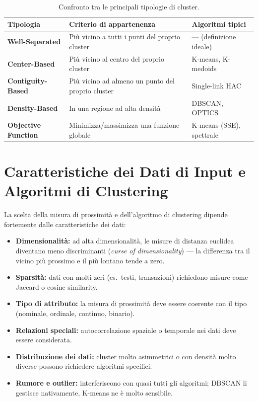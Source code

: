 \begin{table}[htbp]
\centering
\small
\begin{tabularx}{\textwidth}{>{\bfseries}p{3.2cm} >{\raggedright\arraybackslash}X >{\raggedright\arraybackslash}X}
\toprule
Tipologia & Criterio di appartenenza & Algoritmi tipici \\
\midrule
Well-Separated & Più vicino a tutti i punti del proprio cluster & --- (definizione ideale) \\
\addlinespace
Center-Based & Più vicino al centro del proprio cluster & K-means, K-medoids \\
\addlinespace
Contiguity-Based & Più vicino ad almeno un punto del proprio cluster & Single-link HAC \\
\addlinespace
Density-Based & In una regione ad alta densità & DBSCAN, OPTICS \\
\addlinespace
Objective Function & Minimizza/massimizza una funzione globale & K-means (SSE), spettrale \\
\bottomrule
\end{tabularx}
\caption{Confronto tra le principali tipologie di cluster.}
\label{tab:cluster-types}
\end{table}

\section{Caratteristiche dei Dati di Input e Algoritmi di Clustering}
\label{sec:clustering-input}

La scelta della misura di prossimità e dell'algoritmo di clustering dipende fortemente dalle caratteristiche dei dati:

\begin{itemize}
  \item \textbf{Dimensionalità:} ad alta dimensionalità, le misure di distanza euclidea diventano meno discriminanti (\textit{curse of dimensionality}) — la differenza tra il vicino più prossimo e il più lontano tende a zero.
  \item \textbf{Sparsità:} dati con molti zeri (es.\ testi, transazioni) richiedono misure come Jaccard o cosine similarity.
  \item \textbf{Tipo di attributo:} la misura di prossimità deve essere coerente con il tipo (nominale, ordinale, continuo, binario).
  \item \textbf{Relazioni speciali:} autocorrelazione spaziale o temporale nei dati deve essere considerata.
  \item \textbf{Distribuzione dei dati:} cluster molto asimmetrici o con densità molto diverse possono richiedere algoritmi specifici.
  \item \textbf{Rumore e outlier:} interferiscono con quasi tutti gli algoritmi; DBSCAN li gestisce nativamente, K-means ne è molto sensibile.
\end{itemize}

